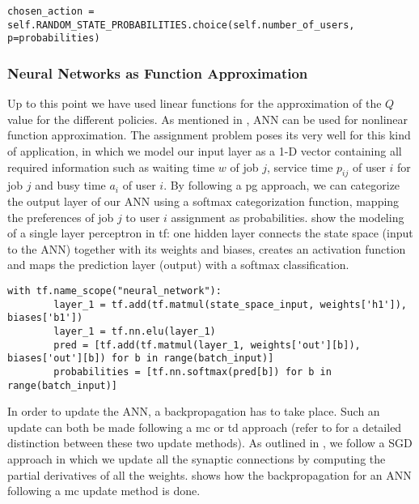 \documentclass{seal_thesis}
\begin{document}
\begin{lstlisting}[caption=Probabilistic user choice,label=lst:prob_user_choice,style=CustomPython]
	chosen_action = self.RANDOM_STATE_PROBABILITIES.choice(self.number_of_users, p=probabilities)
\end{lstlisting}

\subsubsection{Neural Networks as Function Approximation}

Up to this point we have used linear functions for the approximation of the $Q$ value for the different policies. As mentioned in , ANN can be used for nonlinear function approximation. The assignment problem poses its very well for this kind of application, in which we model our input layer as a 1-D vector containing all required information such as waiting time $w$ of job $j$, service time $p_{ij}$ of user $i$ for job $j$ and busy time $a_i$ of user $i$. By following a \gls{pg} approach, we can categorize the output layer of our ANN using a softmax categorization function, mapping the preferences of job $j$ to user $i$ assignment as probabilities.  show the modeling of a single layer perceptron in \gls{tf}: one hidden layer connects the state space (\ie input to the ANN) together with its weights and biases, creates an activation function and maps the prediction layer (\ie output) with a softmax classification.

\begin{lstlisting}[caption=Modeling of a single perceptron in \gls{tf},label=lst:ann_1h,style=CustomPython]
	with tf.name_scope("neural_network"):
    	layer_1 = tf.add(tf.matmul(state_space_input, weights['h1']), biases['b1'])
    	layer_1 = tf.nn.elu(layer_1)
    	pred = [tf.add(tf.matmul(layer_1, weights['out'][b]), biases['out'][b]) for b in range(batch_input)]
    	probabilities = [tf.nn.softmax(pred[b]) for b in range(batch_input)]
\end{lstlisting}

In order to update the ANN, a backpropagation has to take place. Such an update can both be made following a \gls{mc} or \gls{td} approach (refer to  for a detailed distinction between these two update methods). As outlined in , we follow a SGD approach in which we update all the synaptic connections by computing the partial derivatives of all the weights.  shows how the backpropagation for an ANN following a \gls{mc} update method is done.
\end{document}
